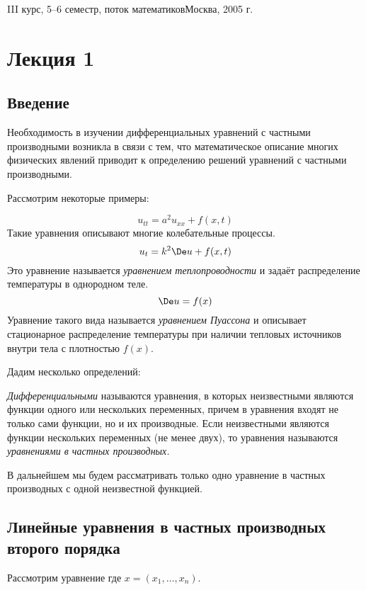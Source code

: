 \documentclass[a4paper,draft]{article}
\begin{document}
\tocsubsubsectionparam{3.5em}
\tocsubsectionparam{3em}
{III курс, 5--6 семестр, поток математиков}{Москва, 2005 г.}

\tableofcontents

\pagebreak

\section{Лекция 1}

\subsection{Введение}
Необходимость в изучении дифференциальных уравнений с частными
производными возникла в связи с тем, что математическое описание многих
физических явлений приводит к определению решений уравнений с частными производными.

Рассмотрим некоторые примеры:

$$u_{tt}=a^2u_{xx}+f(x,t)$$
Такие уравнения описывают многие колебательные процессы.
$$u_t=k^2\De u+ f(x,t)$$
Это уравнение называется \emph{уравнением теплопроводности} и задаёт распределение температуры в однородном теле.
$$\De u =f(x)$$
Уравнение такого вида называется \emph{уравнением Пуассона} и описывает стационарное распределение температуры
при наличии тепловых источников внутри тела с плотностью $f(x)$.

Дадим несколько определений:

\begin{df}
\emph{Дифференциальными} называются уравнения, в которых неизвестными являются функции
одного или нескольких переменных, причем в уравнения входят не только сами функции, но и их производные.
Если неизвестными являются функции нескольких переменных (не менее двух), то уравнения называются
\emph{уравнениями в частных производных.}
\end{df}

В дальнейшем мы будем рассматривать только одно уравнение в частных производных с одной неизвестной функцией.

\subsection{Линейные уравнения в частных производных второго порядка}

Рассмотрим уравнение
где $x=(x_1,\dots,x_n)$.
\end{document}
